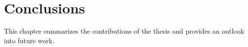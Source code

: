 \chapter{Conclusions\label{cha:chapter6}}

This chapter summarizes the contributions of the thesis and provides an outlook into future work. 